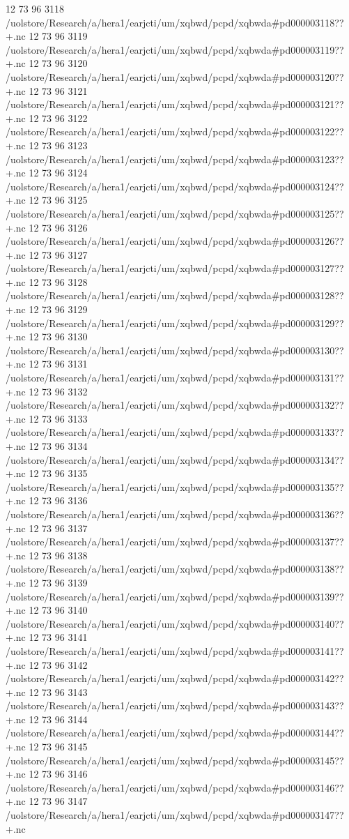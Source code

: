 12 73 96
3118
/uolstore/Research/a/hera1/earjcti/um/xqbwd/pcpd/xqbwda#pd000003118??+.nc
12 73 96
3119
/uolstore/Research/a/hera1/earjcti/um/xqbwd/pcpd/xqbwda#pd000003119??+.nc
12 73 96
3120
/uolstore/Research/a/hera1/earjcti/um/xqbwd/pcpd/xqbwda#pd000003120??+.nc
12 73 96
3121
/uolstore/Research/a/hera1/earjcti/um/xqbwd/pcpd/xqbwda#pd000003121??+.nc
12 73 96
3122
/uolstore/Research/a/hera1/earjcti/um/xqbwd/pcpd/xqbwda#pd000003122??+.nc
12 73 96
3123
/uolstore/Research/a/hera1/earjcti/um/xqbwd/pcpd/xqbwda#pd000003123??+.nc
12 73 96
3124
/uolstore/Research/a/hera1/earjcti/um/xqbwd/pcpd/xqbwda#pd000003124??+.nc
12 73 96
3125
/uolstore/Research/a/hera1/earjcti/um/xqbwd/pcpd/xqbwda#pd000003125??+.nc
12 73 96
3126
/uolstore/Research/a/hera1/earjcti/um/xqbwd/pcpd/xqbwda#pd000003126??+.nc
12 73 96
3127
/uolstore/Research/a/hera1/earjcti/um/xqbwd/pcpd/xqbwda#pd000003127??+.nc
12 73 96
3128
/uolstore/Research/a/hera1/earjcti/um/xqbwd/pcpd/xqbwda#pd000003128??+.nc
12 73 96
3129
/uolstore/Research/a/hera1/earjcti/um/xqbwd/pcpd/xqbwda#pd000003129??+.nc
12 73 96
3130
/uolstore/Research/a/hera1/earjcti/um/xqbwd/pcpd/xqbwda#pd000003130??+.nc
12 73 96
3131
/uolstore/Research/a/hera1/earjcti/um/xqbwd/pcpd/xqbwda#pd000003131??+.nc
12 73 96
3132
/uolstore/Research/a/hera1/earjcti/um/xqbwd/pcpd/xqbwda#pd000003132??+.nc
12 73 96
3133
/uolstore/Research/a/hera1/earjcti/um/xqbwd/pcpd/xqbwda#pd000003133??+.nc
12 73 96
3134
/uolstore/Research/a/hera1/earjcti/um/xqbwd/pcpd/xqbwda#pd000003134??+.nc
12 73 96
3135
/uolstore/Research/a/hera1/earjcti/um/xqbwd/pcpd/xqbwda#pd000003135??+.nc
12 73 96
3136
/uolstore/Research/a/hera1/earjcti/um/xqbwd/pcpd/xqbwda#pd000003136??+.nc
12 73 96
3137
/uolstore/Research/a/hera1/earjcti/um/xqbwd/pcpd/xqbwda#pd000003137??+.nc
12 73 96
3138
/uolstore/Research/a/hera1/earjcti/um/xqbwd/pcpd/xqbwda#pd000003138??+.nc
12 73 96
3139
/uolstore/Research/a/hera1/earjcti/um/xqbwd/pcpd/xqbwda#pd000003139??+.nc
12 73 96
3140
/uolstore/Research/a/hera1/earjcti/um/xqbwd/pcpd/xqbwda#pd000003140??+.nc
12 73 96
3141
/uolstore/Research/a/hera1/earjcti/um/xqbwd/pcpd/xqbwda#pd000003141??+.nc
12 73 96
3142
/uolstore/Research/a/hera1/earjcti/um/xqbwd/pcpd/xqbwda#pd000003142??+.nc
12 73 96
3143
/uolstore/Research/a/hera1/earjcti/um/xqbwd/pcpd/xqbwda#pd000003143??+.nc
12 73 96
3144
/uolstore/Research/a/hera1/earjcti/um/xqbwd/pcpd/xqbwda#pd000003144??+.nc
12 73 96
3145
/uolstore/Research/a/hera1/earjcti/um/xqbwd/pcpd/xqbwda#pd000003145??+.nc
12 73 96
3146
/uolstore/Research/a/hera1/earjcti/um/xqbwd/pcpd/xqbwda#pd000003146??+.nc
12 73 96
3147
/uolstore/Research/a/hera1/earjcti/um/xqbwd/pcpd/xqbwda#pd000003147??+.nc
